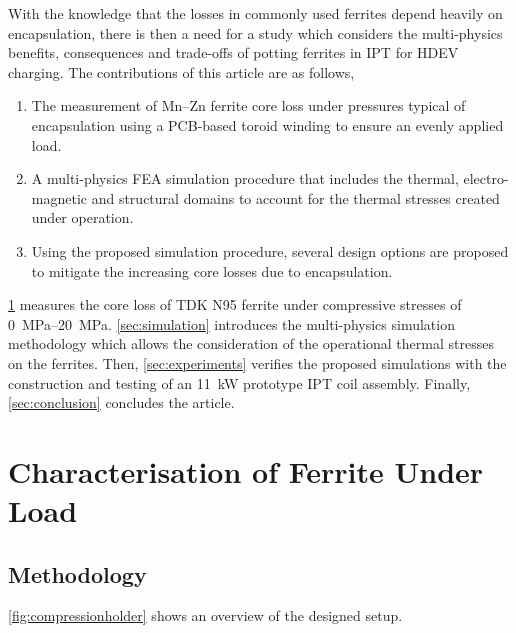 \documentclass[conference]{IEEEtran}
\begin{document}
With the knowledge that the losses in commonly used ferrites depend heavily on encapsulation, there is then a need for a study which considers the multi-physics benefits, consequences and trade-offs of potting ferrites in IPT for HDEV charging. 
The contributions of this article are as follows, 
\begin{enumerate}
  \item The measurement of Mn--Zn ferrite core loss under pressures typical of encapsulation using a PCB-based toroid winding to ensure an evenly applied load. 
  \item A multi-physics FEA simulation procedure that includes the thermal, electro-magnetic and structural domains to account for the thermal stresses created under operation. 
  \item Using the proposed simulation procedure, several design options are proposed to mitigate the increasing core losses due to encapsulation. 
\end{enumerate}

\cref{sec:characterisation} measures the core loss of TDK N95 ferrite under compressive stresses of \SIrange{0}{20}{\mega\pascal}. 
\cref{sec:simulation} introduces the multi-physics simulation methodology which allows the consideration of the operational thermal stresses on the ferrites.
Then, \cref{sec:experiments} verifies the proposed simulations with the construction and testing of an \SI{11}{\kilo\watt} prototype IPT coil assembly. 
Finally, \cref{sec:conclusion} concludes the article. 

\section{Characterisation of Ferrite Under Load}
\label{sec:characterisation}

\subsection{Methodology}

\cref{fig:compressionholder} shows an overview of the designed setup. 
\end{document}
